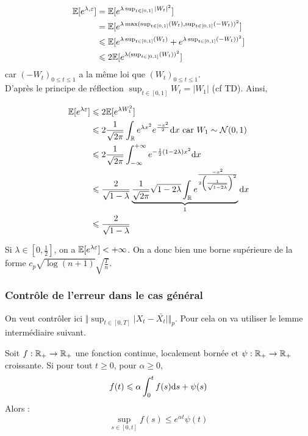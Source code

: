 \begin{equation*}
\begin{split}
  \mathbb{E}[e^{\lambda, \varepsilon}] &= \mathbb{E}[e^{\lambda \sup_{t \in [0,1]} \vert W_t \vert^2} ] \\
  &= \mathbb{E}[e^{\lambda \max(\sup_{t \in [0,1]} (W_t), \sup_{t \in [0,1]} (- W_t))^2} ] \\
  &\leqslant \mathbb{E}[e^{\lambda \sup_{t \in [0,1]} (W_t)} + e^{\lambda \sup_{t \in [0,1]} (- W_t))^2} ] \\
  &\leqslant 2 \mathbb{E}[e^{\lambda (\sup_{t \in [0,1]} (W_t))^2}] \\
\end{split}
\end{equation*}
car $(-W_t)_{0 \leq t \leq 1}$ a la même loi que $(W_t)_{0 \leq t \leq 1}$. \\

D'après le principe de réflection $\sup_{t \in [0,1]} W_t = \vert W_1 \vert$ (cf TD). Ainsi, 

\begin{equation*}
\begin{split}
  \mathbb{E}[e^{\lambda \varepsilon} ] &\leqslant 2 \mathbb{E}[e^{\lambda W_1^2}] \\
  &\leqslant 2 \frac{1}{\sqrt{2\pi}} \int_{\mathbb{R}} e^{\lambda x^2} e^{ \frac{-x^2}{2}} \mathrm{d} x \text{ car } W_1 \sim \mathcal{N}(0,1) \\
  &\leqslant 2 \frac{1}{\sqrt{2\pi}} \int_{-\infty}^{+\infty} e^{- \frac{1}{2} (1 - 2\lambda)x^2} \mathrm{d} x\\
  &\leqslant \frac{2}{\sqrt{1-\lambda}} \underbrace{\frac{1}{\sqrt{2\pi}} \sqrt{1-2\lambda} \int_{\mathbb{R}} e^{ \frac{-x^2}{2 \left( \frac{1}{\sqrt{1-2\lambda}}\right)^2}}}_1 \mathrm{d} x\\
  &\leqslant \frac{2}{\sqrt{1-\lambda}} \\
\end{split}
\end{equation*}

Si $\lambda \in [0, \frac{1}{2}]$, on a $\mathbb{E}[ e^{\lambda \varepsilon} ] < +\infty$. On a donc bien une borne supérieure de la forme $c_p \sqrt{\log(n+1)}\sqrt{ \frac{T}{n}}$.


\subsubsection{Contrôle de l'erreur dans le cas général}
On veut contrôler ici $\Vert \sup_{t \in [0,T]} \vert X_t- \bar{X_t} \vert \Vert_p$. Pour cela on va utiliser le lemme intermédiaire suivant.


\begin{lem}[Gronwald]
  Soit $f : \mathbb{R}_+ \to \mathbb{R}_+$ une fonction continue, localement bornée et $\psi : \mathbb{R}_+ \to \mathbb{R}_+$ croissante. Si pour tout $t \geq 0$, pour $\alpha\geq 0$,
  \begin{equation*}
  \begin{split}
    f(t) \leqslant \alpha \int_{0}^{t} f(s) \mathrm{d} s + \psi(s)
  \end{split}
  \label{gronwald}
  \end{equation*}
  Alors :
  \[ \sup_{s \in [0,t]} f(s) \leq e^{\alpha t} \psi(t) \]
\end{lem}

